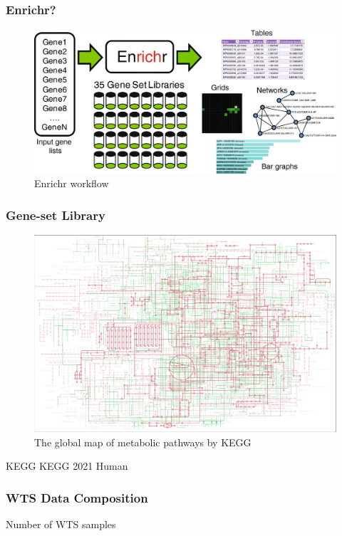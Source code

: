 \documentclass{beamer}
\begin{document}
    \begin{frame}
        \frametitle{Enrichr?}

        \begin{figure}
            \includegraphics[width=0.8 \linewidth]{figures/Workflow/Enrichr.jpg}
            \caption{Enrichr workflow \protect\cite{Enrichr1, Enrichr2}}
        \end{figure}
    \end{frame}

    \begin{frame}
        \frametitle{Gene-set Library}

        \begin{figure}
            \includegraphics[width=0.6 \linewidth]{figures/Workflow/KEGG.jpg}
            \caption{The global map of metabolic pathways by KEGG \protect\cite{KEGG1}}
        \end{figure}

        \begin{block}{KEGG}
            KEGG 2021 Human
        \end{block}
    \end{frame}

    \begin{frame}
        \frametitle{WTS Data Composition}

        \begin{table}
            \caption{Number of WTS samples}
            
        \end{table}
    \end{frame}
\end{document}
